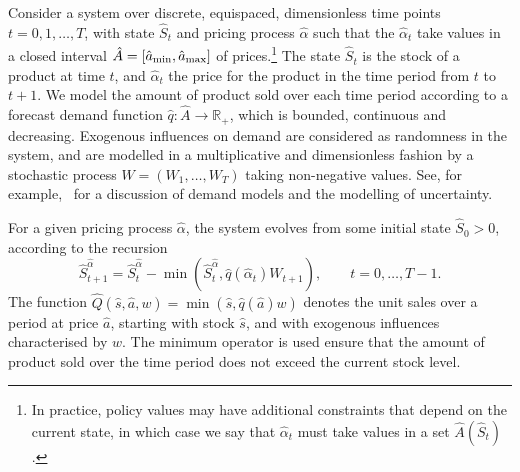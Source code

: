 \documentclass[main.tex]{subfiles}
\begin{document}
Consider a system over discrete, equispaced, dimensionless time points
$t=0,1,\dots,T$, with state
$\hat{S}_t$ and pricing process $\hat{\alpha}$ such that the $\hat{\alpha}_t$ take values in a closed
interval $\hat{A}=\nobreak[\hat{a}_{\mathrm{min}},\hat{a}_{\mathrm{max}}]$ of prices.\footnote{In
  practice, policy values may have additional constraints that depend
  on the current state,
  in which case we say that $\hat{\alpha}_t$ must take values
  in a set $\hat{A}(\hat{S}_t)$.
}
The state $\hat{S}_t$ is the stock of a product at time $t$, and
$\hat{\alpha}_t$ the price for the product in the time period from $t$ to
$t+1$. We model the amount of product sold over each time period according
to a forecast demand
function $\hat{q}:\hat{A}\to\mathbb{R}_+$, which is bounded, continuous and decreasing.
Exogenous influences on demand are considered as randomness in the
system, and are
modelled in a multiplicative and dimensionless fashion by a stochastic process
$W=(W_1,\dots,W_T)$ taking non-negative values. See, for
example,~\citet[Ch.~7]{talluri2006theory} for a discussion of
demand models and the modelling of uncertainty.

For a given pricing process $\hat{\alpha}$, the
system evolves from some initial state $\hat{S}_0>0$, according to the
recursion
\begin{equation}\label{eq:stock_dynamics}
  \hat{S}_{t+1}^{\hat{\alpha}}=\hat{S}_t^{\hat{\alpha}}-\min(\hat{S}_t^{\hat{\alpha}},\hat{q}(\hat{\alpha}_t)W_{t+1}),\qquad t=0,\dots,T-1.
\end{equation}
The function $\hat{Q}(\hat{s},\hat{a},w)=\min(\hat{s},\hat{q}(\hat{a})w)$ denotes the unit sales over a
period at price $\hat{a}$,
starting with stock $\hat{s}$, and with exogenous influences
characterised by $w$. The minimum operator is used ensure that the
amount of product sold over the time period does not exceed the
current stock level.
\end{document}
